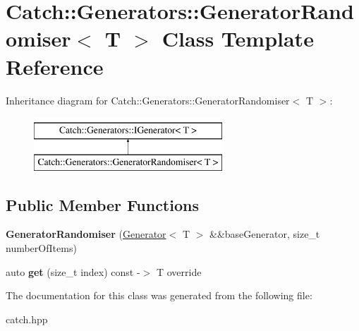 \hypertarget{class_catch_1_1_generators_1_1_generator_randomiser}{}\section{Catch\+:\+:Generators\+:\+:Generator\+Randomiser$<$ T $>$ Class Template Reference}
\label{class_catch_1_1_generators_1_1_generator_randomiser}
Inheritance diagram for Catch\+:\+:Generators\+:\+:Generator\+Randomiser$<$ T $>$\+:\begin{figure}[H]
\begin{center}
\leavevmode
\includegraphics[height=2.000000cm]{class_catch_1_1_generators_1_1_generator_randomiser}
\end{center}
\end{figure}
\subsection*{Public Member Functions}
\begin{DoxyCompactItemize}
\item 
\mbox{\label{class_catch_1_1_generators_1_1_generator_randomiser_aba3234a2885baff107766814d10c2efc}} 
{\bfseries Generator\+Randomiser} (\mbox{\hyperlink{class_catch_1_1_generators_1_1_generator}{Generator}}$<$ T $>$ \&\&base\+Generator, size\+\_\+t number\+Of\+Items)
\item 
\mbox{\label{class_catch_1_1_generators_1_1_generator_randomiser_a4ad5de15865727bdaa638863e0969ab4}} 
auto {\bfseries get} (size\+\_\+t index) const -\/$>$ T override
\end{DoxyCompactItemize}


The documentation for this class was generated from the following file\+:\begin{DoxyCompactItemize}
\item 
catch.\+hpp\end{DoxyCompactItemize}
